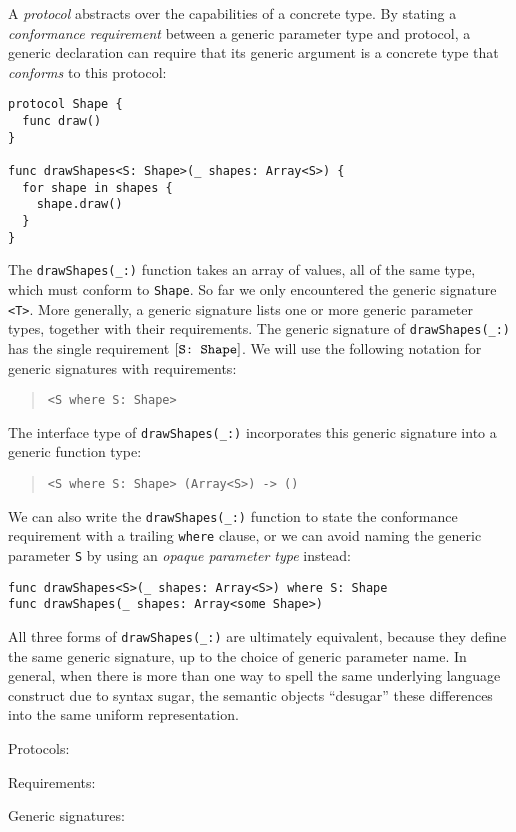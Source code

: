\documentclass[../generics]{subfiles}
\begin{document}
A \emph{protocol} abstracts over the capabilities of a concrete type. By stating a \emph{conformance requirement} between a generic parameter type and protocol, a generic declaration can require that its generic argument is a concrete type that \emph{conforms} to this protocol:
\begin{Verbatim}
protocol Shape {
  func draw()
}

func drawShapes<S: Shape>(_ shapes: Array<S>) {
  for shape in shapes {
    shape.draw()
  }
}
\end{Verbatim}

The \verb|drawShapes(_:)| function takes an array of values, all of the same type, which must conform to \texttt{Shape}. So far we only encountered the generic signature \texttt{<T>}. More generally, a generic signature lists one or more generic parameter types, together with their requirements. The generic signature of \verb|drawShapes(_:)| has the single requirement $[\texttt{S:~Shape}]$. We will use the following notation for generic signatures with requirements:
\begin{quote}
\begin{verbatim}
<S where S: Shape>
\end{verbatim}
\end{quote}
The interface type of \verb|drawShapes(_:)| incorporates this generic signature into a generic function type:
\begin{quote}
\begin{verbatim}
<S where S: Shape> (Array<S>) -> ()
\end{verbatim}
\end{quote}
We can also write the \verb|drawShapes(_:)| function to state the conformance requirement with a trailing \texttt{where} clause, or we can avoid naming the generic parameter \texttt{S} by using an \emph{opaque parameter type} instead:
\begin{Verbatim}
func drawShapes<S>(_ shapes: Array<S>) where S: Shape
func drawShapes(_ shapes: Array<some Shape>)
\end{Verbatim}
All three forms of \verb|drawShapes(_:)| are ultimately equivalent, because they define the same generic signature, up to the choice of generic parameter name. In general, when there is more than one way to spell the same underlying language construct due to syntax sugar, the semantic objects ``desugar'' these differences into the same uniform representation.
\begin{MoreDetails}
\item Protocols: 
\item Requirements: 
\item Generic signatures: 
\end{MoreDetails}
\end{document}
